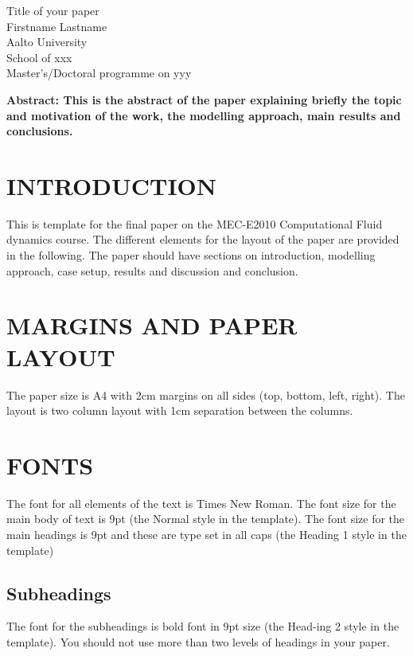 \documentclass[a4paper, english, 9pt,twocolumn]{extarticle} %
\renewcommand\_[2][1]{\ifmmode _{\textnormal{\scalebox{#1}{#2}}}\else\underscore#2\fi} %
\renewcommand\^[2][1]{\ifmmode ^{\textnormal{\scalebox{#1}{#2}}}\else\xor#2\fi} %
\begin{document}
\begin{strip}
\begin{center}
    {\huge 
    Title of your paper
    } \vspace{0.4cm} \\
    Firstname Lastname \\
    Aalto University \\
    School of xxx \\
    Master's/Doctoral programme on yyy
    \vspace{0.4cm}
\end{center}
\end{strip}

\textbf{Abstract:
This is the abstract of the paper explaining briefly the topic and motivation of the work, the modelling approach, main results and conclusions.
} %

\section*{INTRODUCTION} %
This is template for the final paper on the MEC-E2010 Computational Fluid dynamics course. The different elements for the layout of the paper are provided in the following. The paper should have sections on introduction, modelling approach, case setup, results and discussion and conclusion.

\section*{MARGINS AND PAPER LAYOUT}
The paper size is A4 with 2cm margins on all sides (top, bottom, left, right). The layout is two column layout with 1cm separation between the columns. 

\section*{FONTS}
The font for all elements of the text is Times New Roman. The font size for the main body of text is 9pt (the Normal style in the template). The font size for the main headings is 9pt and these are type set in all caps (the Heading 1 style in the template)

\subsection*{Subheadings}
The font for the subheadings is bold font in 9pt size (the Head-ing 2 style in the template). You should not use more than two levels of headings in your paper.
\end{document}
